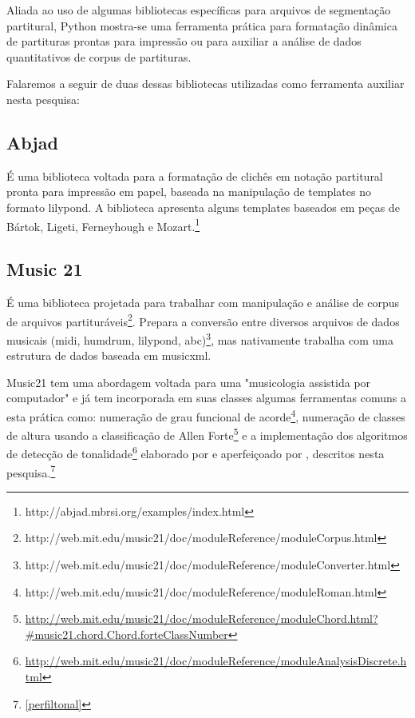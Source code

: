 \documentclass[
	12pt,				%
	openright,			%
	twoside,			%
	a4paper,			%
	english,			%
	french,				%
	spanish,			%
	brazil				%
	]{abntex2}
\begin{document}
Aliada ao uso de algumas bibliotecas específicas para arquivos de segmentação partitural, Python mostra-se uma ferramenta prática para formatação dinâmica de partituras prontas para impressão ou para auxiliar a análise de dados quantitativos de corpus de partituras.

Falaremos a seguir de duas dessas bibliotecas utilizadas como ferramenta auxiliar nesta pesquisa:


\subsection{Abjad}

É uma biblioteca voltada para a formatação de clichês em notação partitural pronta para impressão em papel, baseada na manipulação de templates no formato lilypond. A biblioteca apresenta alguns templates baseados em peças de Bártok, Ligeti, Ferneyhough e Mozart.\footnote{http://abjad.mbrsi.org/examples/index.html}



\subsection{Music 21}

É uma biblioteca projetada para trabalhar com manipulação e análise de corpus de arquivos partituráveis\footnote{http://web.mit.edu/music21/doc/moduleReference/moduleCorpus.html}. Prepara a conversão entre diversos arquivos de dados musicais (midi, humdrum, lilypond, abc)\footnote{http://web.mit.edu/music21/doc/moduleReference/moduleConverter.html}, mas nativamente trabalha com uma estrutura de dados baseada em musicxml.

Music21 tem uma abordagem voltada para uma "musicologia assistida por computador" e já tem incorporada em suas classes algumas ferramentas comuns a esta prática como: numeração de grau funcional de acorde\footnote{http://web.mit.edu/music21/doc/moduleReference/moduleRoman.html}, numeração de classes de altura usando a classificação de Allen Forte\footnote{\url{http://web.mit.edu/music21/doc/moduleReference/moduleChord.html?\#music21.chord.Chord.forteClassNumber}} e a implementação dos algoritmos de detecção de tonalidade\footnote{\url{http://web.mit.edu/music21/doc/moduleReference/moduleAnalysisDiscrete.html}} elaborado por  e aperfeiçoado por , descritos nesta pesquisa.\footnote{\autoref{perfiltonal}}


\end{document}
